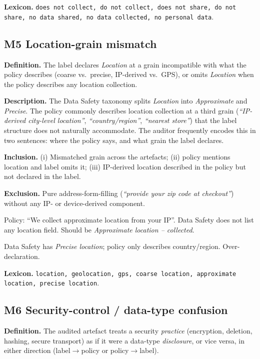 \documentclass[11pt,a4paper]{article}
\newcommand{\code}[1]{\textsf{\textbf{#1}}}
\begin{document}
\textbf{Lexicon.} \texttt{does not collect, do not collect, does not
share, do not share, no data shared, no data collected, no personal
data}.

\subsection{\code{M5} Location-grain mismatch}
\label{sec:M5}
\textbf{Definition.} The label declares \textsl{Location} at a grain
incompatible with what the policy describes (coarse vs.\ precise, IP-derived
vs.\ GPS), or omits \textsl{Location} when the policy describes any
location collection.

\textbf{Description.} The Data Safety taxonomy splits \textsl{Location}
into \textsl{Approximate} and \textsl{Precise}. The policy commonly
describes location collection at a third grain (\textit{``IP-derived
city-level location''}, \textit{``country/region''},
\textit{``nearest store''}) that the label structure does not
naturally accommodate. The auditor frequently encodes this in two
sentences: where the policy says, and what grain the label declares.

\textbf{Inclusion.} (i) Mismatched grain across the artefacts;
(ii) policy mentions location and label omits it; (iii) IP-derived
location described in the policy but not declared in the label.

\textbf{Exclusion.} Pure address-form-filling
(\textit{``provide your zip code at checkout''}) without any IP- or
device-derived component.

\begin{rationale}
Policy: ``We collect approximate location from your IP''. Data
Safety does not list any location field. Should be \textsl{Approximate
location -- collected}.
\end{rationale}
\begin{rationale}
[APP-$0509$] Data Safety has \textsl{Precise location}; policy only
describes country/region. Over-declaration.
\end{rationale}

\textbf{Lexicon.} \texttt{location, geolocation, gps, coarse location,
approximate location, precise location}.

\subsection{\code{M6} Security-control / data-type confusion}
\label{sec:M6}
\textbf{Definition.} The audited artefact treats a security
\emph{practice} (encryption, deletion, hashing, secure transport) as
if it were a data-type \emph{disclosure}, or vice versa, in either
direction (label$\to$policy or policy$\to$label).
\end{document}

